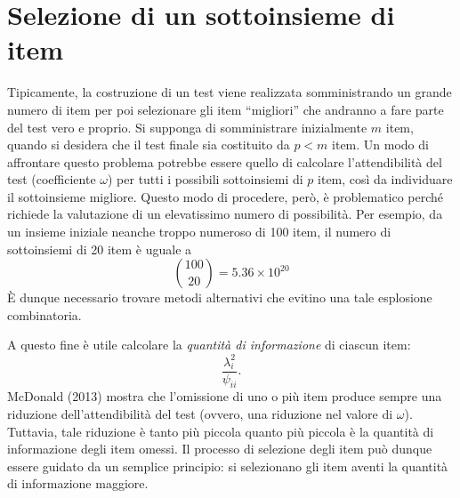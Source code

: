 \section{Selezione di un sottoinsieme di item}

Tipicamente, la costruzione di un test viene realizzata somministrando un grande numero di item per poi selezionare gli item ``migliori'' che andranno a fare parte del test vero e proprio. Si supponga di somministrare inizialmente $m$ item, quando si desidera che il test finale sia costituito da $p < m$ item.  Un modo di affrontare questo problema potrebbe essere quello di calcolare l'attendibilità del test (coefficiente $\omega$) per tutti i possibili sottoinsiemi di $p$ item, così da individuare  il sottoinsieme migliore. Questo modo di procedere, però, è problematico perché richiede la valutazione di un elevatissimo numero di possibilità. Per esempio, da un insieme iniziale neanche troppo numeroso di 100 item, il numero di sottoinsiemi di 20 item è uguale a 
$$
\binom{100}{20} = 5.36 \times 10^{20}
$$ 
È dunque necessario trovare metodi alternativi che evitino una tale esplosione combinatoria.

A questo fine è utile calcolare la \emph{quantità di informazione} di ciascun item:
\begin{equation}
\frac{\lambda_i^2}{\psi_{ii}}.
\end{equation}
McDonald (2013) mostra che l'omissione di uno o più item produce sempre una riduzione dell'attendibilità del test (ovvero, una riduzione nel valore di  $\omega$). 
Tuttavia, tale riduzione è tanto più piccola quanto più piccola è la quantità di
informazione degli item omessi. Il processo di selezione degli item può dunque essere guidato da un semplice principio: si selezionano gli item  aventi la  quantità di informazione maggiore. 

